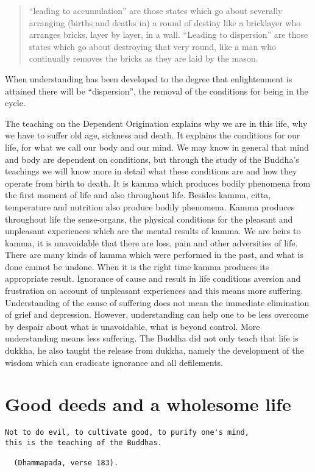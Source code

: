 \documentclass{book}
\begin{document}
\begin{quote}
``leading to accumulation'' are those states which go about severally
arranging (births and deaths in) a round of destiny like a bricklayer
who arranges bricks, layer by layer, in a wall. ``Leading to
dispersion'' are those states which go about destroying that very round,
like a man who continually removes the bricks as they are laid by the
mason.
\end{quote}

When understanding has been developed to the degree that enlightenment
is attained there will be ``dispersion'', the removal of the conditions
for being in the cycle.

The teaching on the Dependent Origination explains why we are in this
life, why we have to suffer old age, sickness and death. It explains the
conditions for our life, for what we call our body and our mind. We may
know in general that mind and body are dependent on conditions, but
through the study of the Buddha's teachings we will know more in detail
what these conditions are and how they operate from birth to death. It
is kamma which produces bodily phenomena from the first moment of life
and also throughout life. Besides kamma, citta, temperature and
nutrition also produce bodily phenomena. Kamma produces throughout life
the sense-organs, the physical conditions for the pleasant and
unpleasant experiences which are the mental results of kamma. We are
heirs to kamma, it is unavoidable that there are loss, pain and other
adversities of life. There are many kinds of kamma which were performed
in the past, and what is done cannot be undone. When it is the right
time kamma produces its appropriate result. Ignorance of cause and
result in life conditions aversion and frustration on account of
unpleasant experiences and this means more suffering. Understanding of
the cause of suffering does not mean the immediate elimination of grief
and depression. However, understanding can help one to be less overcome
by despair about what is unavoidable, what is beyond control. More
understanding means less suffering. The Buddha did not only teach that
life is dukkha, he also taught the release from dukkha, namely the
development of the wisdom which can eradicate ignorance and all
defilements.

\chapter{Good deeds and a wholesome life}

\begin{verbatim}
Not to do evil, to cultivate good, to purify one's mind,
this is the teaching of the Buddhas.

  (Dhammapada, verse 183).
\end{verbatim}
\end{document}
